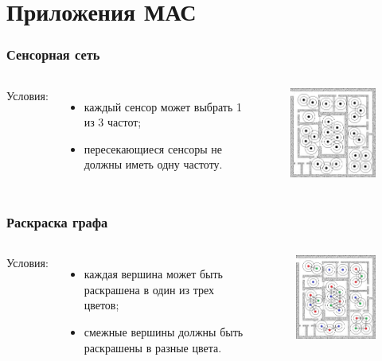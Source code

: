 \documentclass{beamer}
\begin{document}
\section{Приложения МАС}

\begin{frame}
  \frametitle{Сенсорная сеть}
  \begin{columns}[c]
    Условия:
    \begin{itemize}
      \item каждый сенсор может выбрать 1 из 3 частот;
      \item пересекающиеся сенсоры не должны иметь одну частоту.
    \end{itemize}

    \begin{figure}
       \includegraphics[width=5cm]{images/sensors.jpg}
    \end{figure}
  \end{columns}
\end{frame}

\begin{frame}
  \frametitle{Раскраска графа}
  \begin{columns}[c]
    Условия:
    \begin{itemize}
      \item каждая вершина может быть раскрашена в один из трех цветов;
      \item смежные вершины должны быть раскрашены в разные цвета.
    \end{itemize}

    \begin{figure}
       \includegraphics[width=5cm]{images/graph-coloring.jpg}
    \end{figure}
  \end{columns}
\end{frame}
\end{document}
